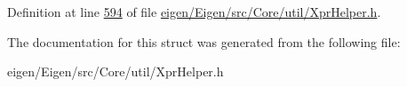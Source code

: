 Definition at line \hyperlink{eigen_2_eigen_2src_2_core_2util_2_xpr_helper_8h_source_l00594}{594} of file \hyperlink{eigen_2_eigen_2src_2_core_2util_2_xpr_helper_8h_source}{eigen/\+Eigen/src/\+Core/util/\+Xpr\+Helper.\+h}.



The documentation for this struct was generated from the following file\+:\begin{DoxyCompactItemize}
\item 
eigen/\+Eigen/src/\+Core/util/\+Xpr\+Helper.\+h\end{DoxyCompactItemize}
